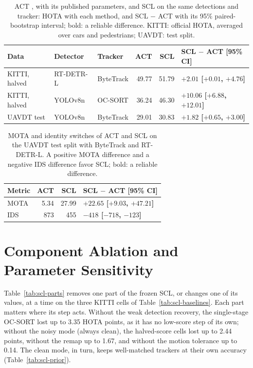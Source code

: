 \begin{table}[tbp]
\centering
\caption{ACT \cite{act2026adaptive}, with its published parameters, and SCL on the same detections and tracker: HOTA with each method, and SCL $-$ ACT with its 95\% paired-bootstrap interval; bold: a reliable difference. KITTI: official HOTA, averaged over cars and pedestrians; UAVDT: test split.}
\label{tab:scl-act}
\begin{tabular}{lllrrl}
\toprule
Data & Detector & Tracker & ACT & SCL & SCL $-$ ACT [95\% CI]\\
\midrule
KITTI, halved & RT-DETR-L & ByteTrack & 49.77 & 51.79 & \textbf{$+2.01$ [$+0.01$, $+4.76$]}\\
KITTI, halved & YOLOv8n & OC-SORT & 36.24 & 46.30 & \textbf{$+10.06$ [$+6.88$, $+12.01$]}\\
UAVDT test & YOLOv8n & ByteTrack & 29.01 & 30.83 & \textbf{$+1.82$ [$+0.65$, $+3.00$]}\\
\bottomrule
\end{tabular}
\end{table}

\begin{table}[tbp]
\centering
\caption{MOTA and identity switches of ACT and SCL on the UAVDT test split with ByteTrack and RT-DETR-L. A positive MOTA difference and a negative IDS difference favor SCL; bold: a reliable difference.}
\label{tab:scl-act-uavdt}
\begin{tabular}{lrrl}
\toprule
Metric & ACT & SCL & SCL $-$ ACT [95\% CI]\\
\midrule
MOTA & 5.34 & 27.99 & \textbf{$+22.65$ [$+9.03$, $+47.21$]}\\
IDS & 873 & 455 & \textbf{$-418$ [$-718$, $-123$]}\\
\bottomrule
\end{tabular}
\end{table}

\section{Component Ablation and Parameter Sensitivity}\label{sec:scl-ablation}
Table~\ref{tab:scl-parts} removes one part of the frozen SCL, or changes one of its values, at a time on the three KITTI cells of Table~\ref{tab:scl-baselines}. Each part matters where its step acts. Without the weak detection recovery, the single-stage OC-SORT lost up to 3.35 HOTA points, as it has no low-score step of its own; without the noisy mode (always clean), the halved-score cells lost up to 2.44 points, without the remap up to 1.67, and without the motion tolerance up to 0.14. The clean mode, in turn, keeps well-matched trackers at their own accuracy (Table~\ref{tab:scl-prior}).

